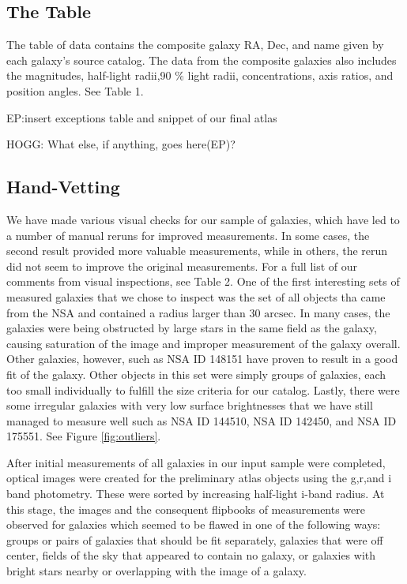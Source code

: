 \documentclass[12pt,preprint,pdftex]{aastex}
\newcommand{\units}[1]{\mathrm{#1}}
\renewcommand{\arcsec}{\units{arcsec}}
\begin{document}
\subsection{The Table}
The table of data contains the composite galaxy RA, Dec, and name
given by each galaxy's source catalog. The data from the composite
galaxies also includes the magnitudes, half-light radii,90 \% light
radii, concentrations, axis ratios, and position angles. See Table 1.

EP:insert exceptions table and snippet of our final atlas

HOGG: What else, if anything, goes here(EP)?

\subsection{Hand-Vetting}\label{sec:handvetting}
We have made various visual checks for our sample of galaxies, which
have led to a number of manual reruns for improved measurements. In
some cases, the second result provided more valuable measurements,
while in others, the rerun did not seem to improve the original
measurements. For a full list of our comments from visual inspections,
see Table 2. One of the first interesting sets of measured galaxies
that we chose to inspect was the set of all objects tha came from the
NSA and contained a radius larger than 30 $\arcsec$. In many cases,
the galaxies were being obstructed by large stars in the same field as
the galaxy, causing saturation of the image and improper measurement
of the galaxy overall. Other galaxies, however, such as NSA ID 148151
have proven to result in a good fit of the galaxy. Other objects in
this set were simply groups of galaxies, each too small individually
to fulfill the size criteria for our catalog. Lastly, there were some
irregular galaxies with very low surface brightnesses that we have
still managed to measure well such as NSA ID 144510, NSA ID 142450,
and NSA ID 175551. See Figure \ref{fig:outliers}.

After initial measurements of all galaxies in our input sample were
completed, optical images were created for the preliminary atlas
objects using the g,r,and i band photometry. These were sorted by
increasing half-light i-band radius. At this stage, the images and the
consequent flipbooks of measurements were observed for galaxies which
seemed to be flawed in one of the following ways: groups or pairs of
galaxies that should be fit separately, galaxies that were off
center, fields of the sky that appeared to contain no galaxy, or
galaxies with bright stars nearby or overlapping with the image of a
galaxy.
\end{document}
